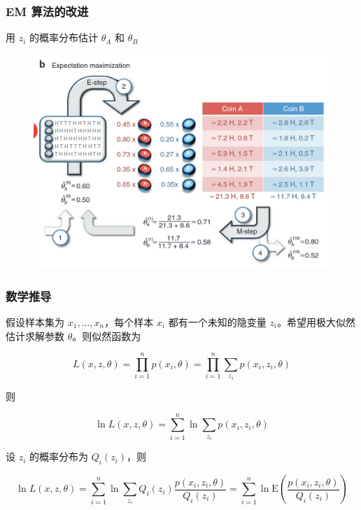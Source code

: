 \documentclass{beamer}
\def\E{\mathrm{E}}
\newcommand{\Gh}{\theta}
\begin{document}
\begin{frame}
    \frametitle{EM 算法的改进}

    用 $z_i$ 的概率分布估计 $\Gh_A$ 和 $\Gh_B$
    
    \begin{figure}
        \centering
        \includegraphics[width=.8\textwidth]{res/em.png}
    \end{figure}

\end{frame}

\begin{frame}
    \frametitle{数学推导}

    假设样本集为 $x_1, \dots, x_n$，每个样本 $x_i$ 都有一个未知的隐变量 $z_i$。希望用极大似然估计求解参数 $\Gh$。则似然函数为

    \[L(x, z, \Gh) = \prod_{i = 1}^{n} p(x_i, \Gh) =  \prod_{i = 1}^{n} \sum_{z_i}p(x_i, z_i, \Gh)\]

    则

    \[\ln L(x, z, \Gh) = \sum_{i = 1}^{n}\ln \sum_{z_i} p(x_i, z_i, \Gh)\]

    设 $z_i$ 的概率分布为 $Q_i(z_i)$，则

    \[\ln L(x, z, \Gh) = \sum_{i = 1}^{n}\ln \sum_{z_i} Q_i(z_i) \frac{p(x_i, z_i, \Gh)}{Q_i(z_i)} = \sum_{i = 1}^{n}\ln \E(\frac{p(x_i, z_i, \Gh)}{Q_i(z_i)})\]

\end{frame}
\end{document}
